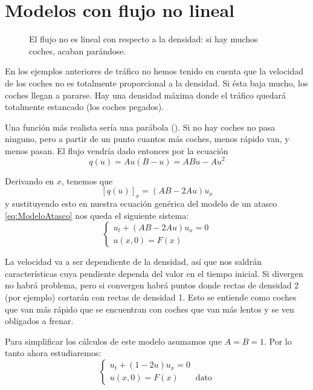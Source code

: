 	\section{Modelos con flujo no lineal}
	\label{sec:ModeloTraficoRealista}

		\begin{wrapfigure}{R}{0.4\textwidth}
			\centering
			\vspace{-15pt}
			\caption{El flujo no es lineal con respecto a la densidad: si hay muchos coches, acaban parándose.}
			\label{fig:parabola}
		\end{wrapfigure}

		En los ejemplos anteriores de tráfico no hemos tenido en cuenta que la velocidad de los coches no es totalmente proporcional a la densidad. Si ésta baja mucho, los coches llegan a pararse. Hay una densidad máxima donde el tráfico quedará totalmente estancado (los coches pegados).

		Una función más realista sería una parábola (). Si no hay coches no pasa ninguno, pero a partir de un punto cuantos más coches, menos rápido van, y menos pasan. El flujo vendría dado entonces por la ecuación \[
		q(u) = Au (B-u) = ABu - Au^{2} \]

		Derivando en $x$, tenemos que \[ [q(u)]_x = (AB - 2Au) u_x\] y sustituyendo esto en nuestra ecuación genérica del modelo de un atasco \eqref{eq:ModeloAtasco} nos queda el siguiente sistema: \[ \begin{cases}
		u_t + (AB - 2Au) u_x = 0 \\ u(x,0) = F(x)\end{cases}\]

		La velocidad va a ser dependiente de la densidad, así que nos saldrán características cuya pendiente dependa del valor en el tiempo inicial. Si divergen no habrá problema, pero si convergen habrá puntos donde rectas de densidad 2 (por ejemplo) cortarán con rectas de densidad 1. Esto se entiende como coches que van más rápido que se encuentran con coches que van más lentos y se ven obligados a frenar.

		Para simplificar los cálculos de este modelo asumamos que $A = B = 1$. Por lo tanto ahora estudiaremos:
		\begin{equation*}
			\left\{
			\begin{array}{l}
				u_t + (1-2u)u_{x} = 0 \\
				u(x, 0) = F(x) \quad \quad \text{dato}
			\end{array}
			\right.
		\end{equation*}

